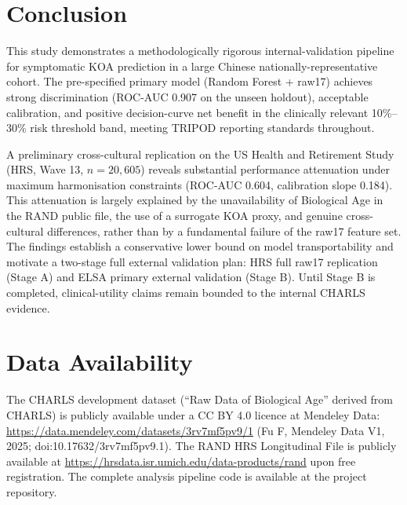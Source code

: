 \documentclass[11pt,a4paper]{article}
\begin{document}
\section{Conclusion}
This study demonstrates a methodologically rigorous internal-validation pipeline for symptomatic KOA
prediction in a large Chinese nationally-representative cohort. The pre-specified primary model
(Random Forest + raw17) achieves strong discrimination (ROC-AUC 0.907 on the unseen holdout),
acceptable calibration, and positive decision-curve net benefit in the clinically relevant
10\%--30\% risk threshold band, meeting TRIPOD reporting standards throughout.

A preliminary cross-cultural replication on the US Health and Retirement Study (HRS, Wave 13,
$n=20{,}605$) reveals substantial performance attenuation under maximum harmonisation constraints
(ROC-AUC 0.604, calibration slope 0.184). This attenuation is largely explained by the unavailability
of Biological Age in the RAND public file, the use of a surrogate KOA proxy, and genuine
cross-cultural differences, rather than by a fundamental failure of the raw17 feature set. The
findings establish a conservative lower bound on model transportability and motivate a two-stage
full external validation plan: HRS full raw17 replication (Stage A) and ELSA primary external
validation (Stage B). Until Stage B is completed, clinical-utility claims remain bounded to the
internal CHARLS evidence.

\section*{Data Availability}
The CHARLS development dataset (``Raw Data of Biological Age'' derived from CHARLS) is publicly
available under a CC BY 4.0 licence at Mendeley Data:
\url{https://data.mendeley.com/datasets/3rv7mf5pv9/1} (Fu F, Mendeley Data V1, 2025;
doi:10.17632/3rv7mf5pv9.1). The RAND HRS Longitudinal File is publicly available at
\url{https://hrsdata.isr.umich.edu/data-products/rand} upon free registration. The complete
analysis pipeline code is available at the project repository.
\end{document}
